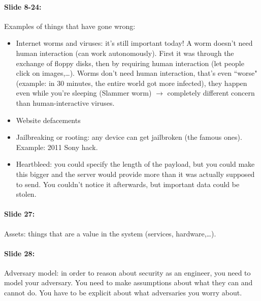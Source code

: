 \documentclass[10pt,a4paper]{report}
\begin{document}
\paragraph{Slide 8-24:} Examples of things that have gone wrong:
\begin{itemize}
\item Internet worms and viruses: it's still important today! A worm doesn't need human interaction (can work autonomously). First it was through the exchange of floppy disks, then by requiring human interaction (let people click on images,…). Worms don't need human interaction, that's even ``worse" (example: in 30 minutes, the entire world got more infected), they happen even while you're sleeping (Slammer worm) $\rightarrow$ completely different concern than human-interactive viruses.
\item Website defacements
\item Jailbreaking or rooting: any device can get jailbroken (the famous ones). Example: 2011 Sony hack. 
\item Heartbleed: you could specify the length of the payload, but you could make this bigger and the server would provide more than it was actually supposed to send. You couldn't notice it afterwards, but important data could be stolen.
\end{itemize}

\paragraph{Slide 27:}Assets: things that are a value in the system (services, hardware,…).

\paragraph{Slide 28:}Adversary model: in order to reason about security as an engineer, you need to model your adversary. You need to make assumptions about what they can and cannot do. You have to be explicit about what adversaries you worry about.
\end{document}
